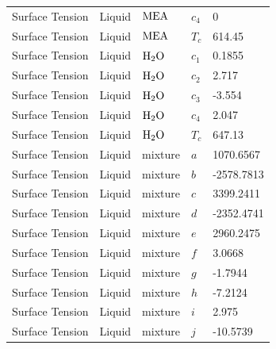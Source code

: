 \documentclass[a4paper,fleqn]{cas-sc}
\begin{document}
\begin{longtable}{lllll}
        Surface Tension           & Liquid         & $\ce{MEA}$          & $c_4$             & 0              \\
        Surface Tension           & Liquid         & $\ce{MEA}$          & $T_c$             & 614.45         \\
        Surface Tension           & Liquid         & $\ce{H2O}$          & $c_1$             & 0.1855         \\
        Surface Tension           & Liquid         & $\ce{H2O}$          & $c_2$             & 2.717          \\
        Surface Tension           & Liquid         & $\ce{H2O}$          & $c_3$             & -3.554         \\
        Surface Tension           & Liquid         & $\ce{H2O}$          & $c_4$             & 2.047          \\
        Surface Tension           & Liquid         & $\ce{H2O}$          & $T_c$             & 647.13         \\
        Surface Tension           & Liquid         & mixture             & $a$               & 1070.6567      \\
        Surface Tension           & Liquid         & mixture             & $b$               & -2578.7813     \\
        Surface Tension           & Liquid         & mixture             & $c$               & 3399.2411      \\
        Surface Tension           & Liquid         & mixture             & $d$               & -2352.4741     \\
        Surface Tension           & Liquid         & mixture             & $e$               & 2960.2475      \\
        Surface Tension           & Liquid         & mixture             & $f$               & 3.0668         \\
        Surface Tension           & Liquid         & mixture             & $g$               & -1.7944        \\
        Surface Tension           & Liquid         & mixture             & $h$               & -7.2124        \\
        Surface Tension           & Liquid         & mixture             & $i$               & 2.975          \\
        Surface Tension           & Liquid         & mixture             & $j$               & -10.5739       \\

\end{longtable}
\end{document}
